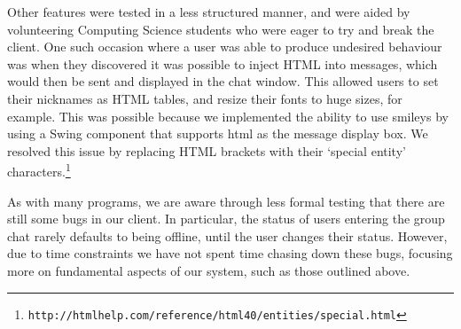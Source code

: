 Other features were tested in a less structured manner, and were aided by volunteering Computing Science students who were eager to try and break the client. One such occasion where a user was able to produce undesired behaviour was when they discovered it was possible to inject HTML into messages, which would then be sent and displayed in the chat window. This allowed users to set their nicknames as HTML tables, and resize their fonts to huge sizes, for example. This was possible because we implemented the ability to use smileys by using a Swing component that supports html as the message display box. We resolved this issue by replacing HTML brackets with their `special entity' characters.\footnote{\texttt{http://htmlhelp.com/reference/html40/entities/special.html}}

As with many programs, we are aware through less formal testing that there are still some bugs in our client. In particular, the status of users entering the group chat rarely defaults to being offline, until the user changes their status. However, due to time constraints we have not spent time chasing down these bugs, focusing more on fundamental aspects of our system, such as those outlined above.

